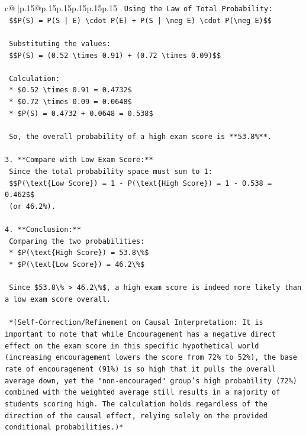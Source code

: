 \documentclass{article}
\begin{document}
{\begin{supertabular}{c@{$\;$}|p{.15\linewidth}@{}p{.15\linewidth}p{.15\linewidth}p{.15\linewidth}p{.15\linewidth}p{.15\linewidth}}
{{{\texttt{    Using the Law of Total Probability:} \\
\texttt{    \$\$P(S) = P(S | E) \textbackslash{}cdot P(E) + P(S | \textbackslash{}neg E) \textbackslash{}cdot P(\textbackslash{}neg E)\$\$} \\
\\ 
\texttt{    Substituting the values:} \\
\texttt{    \$\$P(S) = (0.52 \textbackslash{}times 0.91) + (0.72 \textbackslash{}times 0.09)\$\$} \\
\\ 
\texttt{    Calculation:} \\
\texttt{    *   \$0.52 \textbackslash{}times 0.91 = 0.4732\$} \\
\texttt{    *   \$0.72 \textbackslash{}times 0.09 = 0.0648\$} \\
\texttt{    *   \$P(S) = 0.4732 + 0.0648 = 0.538\$} \\
\\ 
\texttt{    So, the overall probability of a high exam score is **53.8\%**.} \\
\\ 
\texttt{3.  **Compare with Low Exam Score:**} \\
\texttt{    Since the total probability space must sum to 1:} \\
\texttt{    \$\$P(\textbackslash{}text\{Low Score\}) = 1 {-} P(\textbackslash{}text\{High Score\}) = 1 {-} 0.538 = 0.462\$\$} \\
\texttt{    (or 46.2\%).} \\
\\ 
\texttt{4.  **Conclusion:**} \\
\texttt{    Comparing the two probabilities:} \\
\texttt{    *   \$P(\textbackslash{}text\{High Score\}) = 53.8\textbackslash{}\%\$} \\
\texttt{    *   \$P(\textbackslash{}text\{Low Score\}) = 46.2\textbackslash{}\%\$} \\
\\ 
\texttt{    Since \$53.8\textbackslash{}\% > 46.2\textbackslash{}\%\$, a high exam score is indeed more likely than a low exam score overall.} \\
\\ 
\texttt{    *(Self{-}Correction/Refinement on Causal Interpretation: It is important to note that while Encouragement has a negative direct effect on the exam score in this specific hypothetical world (increasing encouragement lowers the score from 72\% to 52\%), the base rate of encouragement (91\%) is so high that it pulls the overall average down, yet the "non{-}encouraged" group's high probability (72\%) combined with the weighted average still results in a majority of students scoring high. The calculation holds regardless of the direction of the causal effect, relying solely on the provided conditional probabilities.)*} \\
}}}
\end{supertabular}}
\end{document}
